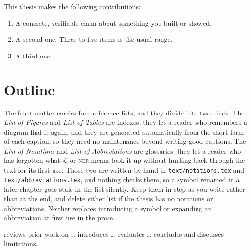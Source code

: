 
This thesis makes the following contributions:
\begin{enumerate}[itemsep=2pt,topsep=4pt]
  \item A concrete, verifiable claim about something you built or showed.
  \item A second one. Three to five items is the usual range.
  \item A third one.
\end{enumerate}

\section{Outline}
\label{sec:outline}


The front matter carries four reference lists, and they divide into two kinds.
The \emph{List of Figures} and \emph{List of Tables} are indexes: they let a
reader who remembers a diagram find it again, and they are generated
automatically from the short form of each caption, so they need no maintenance
beyond writing good captions. The \emph{List of Notations} and \emph{List of
Abbreviations} are glossaries: they let a reader who has forgotten what
$\mathcal{L}$ or \textsc{ner} means look it up without hunting back through
the text for its first use. Those two are written by hand in
\texttt{text/notations.tex} and \texttt{text/abbreviations.tex}, and nothing
checks them, so a symbol renamed in a later chapter goes stale in the list
silently. Keep them in step as you write rather than at the end, and delete
either list if the thesis has no notations or abbreviations. Neither
replaces introducing a symbol or expanding an abbreviation at first use in the
prose.

 reviews prior work on \dots{}
 introduces \dots{}
 evaluates \dots{}
 concludes and discusses limitations.
